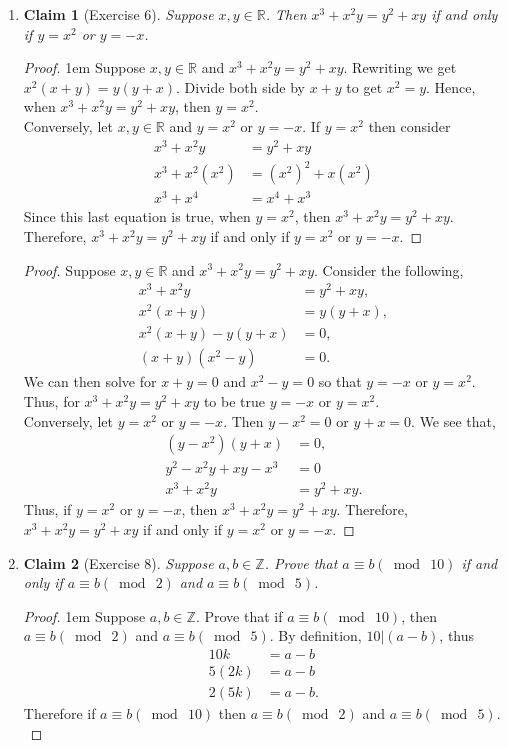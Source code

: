 \documentclass[12 pt]{article}
\newcommand{\R}{\mathbb{R}}
\newcommand{\Z}{\mathbb{Z}}
\newcommand{\e}[1]{a \equiv b (\bmod \ #1)}
\theoremstyle{definition}
\theoremstyle{plain}
\theoremstyle{mytheorem}
\newtheorem{claim}{Claim}
\theoremstyle{myexample}
\theoremstyle{mydefinition}
\begin{document}
\begin{enumerate}
\item \begin{claim}[Exercise 6]  Suppose $x,y \in \R$.  Then $x^3+x^2y=y^2+xy$ if and only if $y=x^2$ or $y=-x$.
\end{claim}

\begin{proof} \openup 1em Suppose $x,y \in \R$ and $x^3+x^2y=y^2+xy$.  Rewriting we get $x^2(x+y)=y(y+x)$.  Divide both side by $x+y$ to get $x^2=y$.  Hence, when $x^3+x^2y=y^2+xy$, then $y=x^2$.\\

	Conversely, let $x,y \in \R$ and $y=x^2$ or $y=-x$.  If $y=x^2$ then consider
		\begin{align*}
		x^3+x^2y &=y^2+xy\\
		x^3+x^2(x^2) &= (x^2)^2+x(x^2)\\
		x^3+x^4 &= x^4+x^3
		\end{align*}
Since this last equation is true, when $y=x^2$, then $x^3+x^2y = y^2+xy$.\\

Therefore, $x^3+x^2y = y^2+xy$ if and only if $y=x^2$ or $y=-x$.
\end{proof}

\begin{proof}  Suppose $x,y \in \R$ and $x^3+x^2y=y^2+xy$.  Consider the following,
	\begin{align*}
	x^3+x^2y &= y^2+xy,\\
	x^2(x+y) &= y(y+x),\\
	x^2(x+y) - y (y+x) &= 0,\\
	(x+y)(x^2-y) &=0.
	\end{align*}
We can then solve for $x+y=0$ and $x^2-y=0$ so that $y=-x$ or $y=x^2$.  Thus, for $x^3+x^2y = y^2+xy$ to be true $y=-x$ or $y=x^2$.\\

Conversely, let $y=x^2$ or $y=-x$.  Then $y-x^2=0$ or $y+x=0$.  We see that,
	\begin{align*}
	(y-x^2)(y+x) &=0 , \\
	y^2-x^2y+xy-x^3 &= 0 \\
	x^3+x^2y &= y^2 +xy.
	\end{align*}
	Thus, if $y=x^2$ or $y=-x$, then $x^3+x^2y = y^2+xy$.  Therefore, $x^3+x^2y = y^2+xy$ if and only if $y=x^2$ or $y=-x$.
\end{proof}

\item \begin{claim}[Exercise 8]  Suppose $a,b \in \Z$.  Prove that $\e{10}$ if and only if $\e{2}$ and $\e{5}$.
\end{claim}
\begin{proof} \openup 1em
Suppose $a,b \in \Z$.  Prove that if $\e{10}$, then $\e{2}$ and $\e{5}$.  By definition, $10 |(a-b)$, thus
	\begin{align*}
	10k &= a-b \\
	5(2k) &= a-b \\
	2(5k) &= a-b.
	\end{align*}
Therefore if $\e{10}$ then $\e{2}$ and $\e{5}$.\\


\end{proof}
\end{enumerate}
\end{document}

